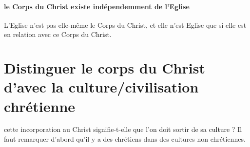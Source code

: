  \paragraph{le Corps du Christ existe indépendemment de l'Eglise}


 L'Eglise n'est pas elle-même le Corps du Christ, et elle n'est Eglise que si elle est en relation avec ce Corps du Christ.
 
\section{Distinguer le corps du Christ d’avec la culture/civilisation chrétienne }

cette incorporation au Christ signifie-t-elle que l'on doit sortir de sa culture ? 
Il faut remarquer d'abord qu'il y a des chrétiens dans des cultures non chrétiennes. 

